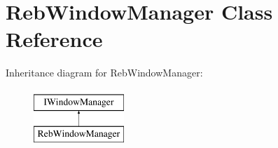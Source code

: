 \hypertarget{class_reb_window_manager}{}\section{Reb\+Window\+Manager Class Reference}
\label{class_reb_window_manager}
Inheritance diagram for Reb\+Window\+Manager\+:\begin{figure}[H]
\begin{center}
\leavevmode
\includegraphics[height=2.000000cm]{class_reb_window_manager}
\end{center}
\end{figure}

